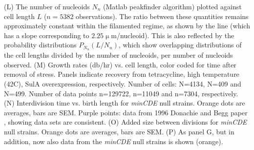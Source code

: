 {(L) The number of nucleoids $N_n$ (Matlab peakfinder algorithm) plotted against cell length $L$ ($n = 5382$ observations). The ratio between these quantities remains approximately constant within the filamented regime, as shown by the line (which has a slope corresponding to $2.25 \upmu$m/nucleoid). This is also reflected by the probability distributions $P_{N_n}(L/N_n)$, which show overlapping distributions of the cell lengths divided by the number of nucleoids, per number of nucleoids observed. 
(M) Growth rates (db/hr) vs. cell length, color coded for time after removal of stress. Panels indicate recovery from tetracycline, high temperature (42C), SulA overexpression, respectively. Number of cells: N=4134, N=409 and N=499. Number of data points n=129722, n=11049 and n=7304, respectively. 
(N) Interdivision time vs. birth length for \textit{minCDE} null strains. Orange dots are averages, bars are SEM. Purple points: data from 1996 Donachie and Begg paper \cite{Donachie1996}, showing data sets are consistent.
(O) Added size between divisions for \textit{minCDE} null strains. Orange dots are averages, bars are SEM. 
(P) As panel G, but in addition, now also data from the \textit{minCDE} null strains is shown (orange).
}
\endgroup


